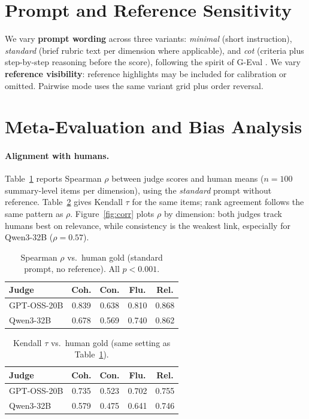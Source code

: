 \documentclass[11pt]{article}
\begin{document}
\section{Prompt and Reference Sensitivity}

We vary \textbf{prompt wording} across three variants: \emph{minimal} (short instruction), \emph{standard} (brief rubric text per dimension where applicable), and \emph{cot} (criteria plus step-by-step reasoning before the score), following the spirit of G-Eval \citep{liu2023geval}. We vary \textbf{reference visibility}: reference highlights may be included for calibration or omitted. Pairwise mode uses the same variant grid plus order reversal.

\section{Meta-Evaluation and Bias Analysis}
\label{sec:meta}

\paragraph{Alignment with humans.}
Table~\ref{tab:corr} reports Spearman $\rho$ between judge scores and human means ($n{=}100$ summary-level items per dimension), using the \emph{standard} prompt without reference. Table~\ref{tab:kendall} gives Kendall $\tau$ for the same items; rank agreement follows the same pattern as $\rho$. Figure~\ref{fig:corr} plots $\rho$ by dimension: both judges track humans best on relevance, while consistency is the weakest link, especially for Qwen3-32B ($\rho{=}0.57$).

\begin{table}[t]
\centering
\small
\begin{tabular}{lcccc}
\toprule
Judge & Coh. & Con. & Flu. & Rel. \\
\midrule
GPT-OSS-20B & 0.839 & 0.638 & 0.810 & 0.868 \\
Qwen3-32B & 0.678 & 0.569 & 0.740 & 0.862 \\
\bottomrule
\end{tabular}
\caption{Spearman $\rho$ vs.\ human gold (standard prompt, no reference). All $p{<}0.001$.}
\label{tab:corr}
\end{table}

\begin{table}[t]
\centering
\small
\begin{tabular}{lcccc}
\toprule
Judge & Coh. & Con. & Flu. & Rel. \\
\midrule
GPT-OSS-20B & 0.735 & 0.523 & 0.702 & 0.755 \\
Qwen3-32B & 0.579 & 0.475 & 0.641 & 0.746 \\
\bottomrule
\end{tabular}
\caption{Kendall $\tau$ vs.\ human gold (same setting as Table~\ref{tab:corr}).}
\label{tab:kendall}
\end{table}
\end{document}

